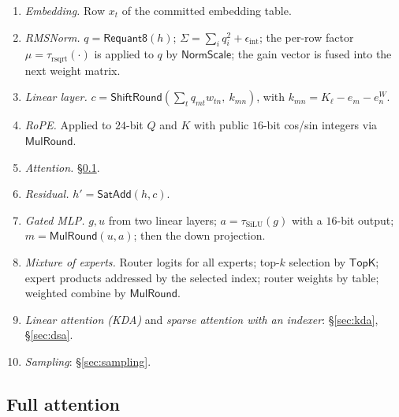 \documentclass[11pt]{article}
\begin{document}
\begin{enumerate}
\item \emph{Embedding.} Row \(x_t\) of the committed embedding table.
\item \emph{RMSNorm.} \(q = \mathsf{Requant8}(h)\); \(\Sigma = \sum_i q_i^2 + \epsilon_{\mathrm{int}}\); the per-row factor \(\mu = \tau_{\mathrm{rsqrt}}(\cdot)\) is applied to \(q\) by \(\mathsf{NormScale}\); the gain vector is fused into the next weight matrix.
\item \emph{Linear layer.} \(c = \mathsf{ShiftRound}(\sum_t q_{mt} w_{tn},\ k_{mn})\), with \(k_{mn} = K_\ell - e_m - e^{W}_n\).
\item \emph{RoPE.} Applied to \(24\)-bit \(Q\) and \(K\) with public \(16\)-bit cos/sin integers via \(\mathsf{MulRound}\).
\item \emph{Attention.} \S\ref{sec:attn}.
\item \emph{Residual.} \(h' = \mathsf{SatAdd}(h, c)\).
\item \emph{Gated MLP.} \(g, u\) from two linear layers; \(a = \tau_{\mathrm{SiLU}}(g)\) with a \(16\)-bit output; \(m = \mathsf{MulRound}(u, a)\); then the down projection.
\item \emph{Mixture of experts.} Router logits for all experts; top-\(k\) selection by \(\mathsf{TopK}\); expert products addressed by the selected index; router weights by table; weighted combine by \(\mathsf{MulRound}\).
\item \emph{Linear attention (KDA)} and \emph{sparse attention with an indexer}: \S\ref{sec:kda}, \S\ref{sec:dsa}.
\item \emph{Sampling}: \S\ref{sec:sampling}.
\end{enumerate}

\subsection{Full attention}
\label{sec:attn}
\end{document}
